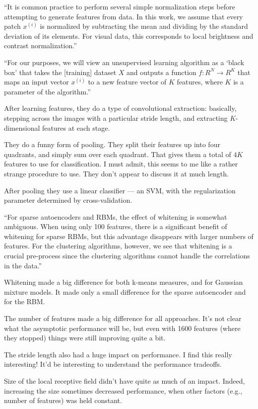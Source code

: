 \documentclass[12pt]{report}
\begin{document}
``It is common practice to perform several simple normalization steps
before attempting to generate features from data.  In this work, we
assume that every patch $x^{(i)}$ is normalized by subtracting the
mean and dividing by the standard deviation of its elements.  For
visual data, this corresponds to local brightness and contrast
normalization.''

``For our purposes, we will view an unsupervised learning algorithm as
a `black box' that takes the [training] dataset $X$ and outputs a
function $f : R^N \rightarrow R^K$ that maps an input vector $x^{(i)}$
to a new feature vector of $K$ features, where $K$ is a parameter of
the algorithm.''  

After learning features, they do a type of convolutional extraction:
basically, stepping across the images with a particular stride length,
and extracting $K$-dimensional features at each stage.

They do a funny form of pooling.  They split their features up into
four quadrants, and simply sum over each quadrant.  That gives them a
total of $4K$ features to use for classification.  I must admit, this
seems to me like a rather strange procedure to use.  They don't appear
to discuss it at much length. 

After pooling they use a linear classifier --- an SVM, with the
regularization parameter determined by cross-validation.

``For sparse autoencoders and RBMs, the effect of whitening is
somewhat ambiguous.  When using only 100 features, there is a
significant benefit of whitening for sparse RBMs, but this advantage
disappears with larger numbers of features.  For the clustering
algorithms, however, we see that whitening is a crucial pre-process
since the clustering algorithms cannot handle the correlations in the
data.''

Whitening made a big difference for both k-means measures, and for
Gaussian mixture models.  It made only a small difference for the
sparse autoencoder and for the RBM.

The number of features made a big difference for all approaches.  It's
not clear what the asymptotic performance will be, but even with 1600
features (where they stopped) things were still improving quite a bit.

The stride length also had a huge impact on performance.  I find this
really interesting!  It'd be interesting to understand the performance
tradeoffs.

Size of the local receptive field didn't have quite as much of an
impact.  Indeed, increasing the size sometimes decreased performance,
when other factors (e.g., number of features) was held constant.  
\end{document}
